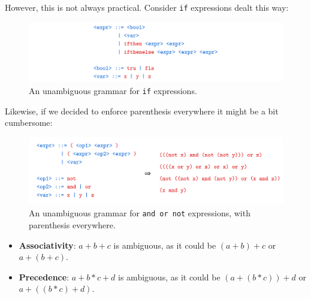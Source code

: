 However, this is not always practical. Consider \texttt{if} expressions dealt this way:
\begin{figure}[h]
    \centering
    \includegraphics[width=1\textwidth]{Sections/Formal/amb3.png}
    \caption{An unambiguous grammar for \texttt{if} expressions.}
    \label{fig:amb3}
\end{figure}

\noindent
Likewise, if we decided to enforce parenthesis everywhere it might be a bit cumbersome:
\begin{figure}[h]
    \centering
    \includegraphics[width=1\textwidth]{Sections/Formal/amb4.png}
    \caption{An unambiguous grammar for \texttt{and or not} expressions, with parenthesis everywhere.}
    \label{fig:amb4}
\end{figure}

\noindent
\begin{theo}
    
    \begin{itemize}
        \item \textbf{Associativity}: $a + b + c$ is ambiguous, as it could be $(a + b) + c$ or $a + (b + c)$.
        \item \textbf{Precedence}: $a + b * c + d$ is ambiguous, as it could be $(a + (b * c)) + d$ or $a + ((b * c) + d)$.
    \end{itemize}
    \end{theo}
\newpage 

